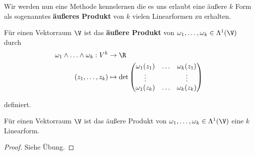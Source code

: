 \par
Wir werden nun eine Methode kennelernen die es uns erlaubt eine äußere \(k\) Form als sogenanntes \textbf{äußeres Produkt} von \(k\) vielen Linearformen zu erhalten.
\label{vektoranalysis/multilinear:definition-16}
\begin{definition}{}{}



\par
Für einen Vektorraum \(\V\) ist das \textbf{äußere Produkt} von \(\omega_1,\ldots,\omega_k\in\Lambda^1(\V)\)
durch
\begin{align*}
\omega_1\wedge\ldots\wedge\omega_k:V^k&\to\R\\
(z_1,\ldots,z_k)&\mapsto 
\det
\begin{pmatrix}
\omega_1(z_1)&\ldots&\omega_k(z_1)\\ 
\vdots&&\vdots\\
\omega_1(z_k)&\ldots&\omega_k(z_k)
\end{pmatrix}
\end{align*}
\par
definiert.
\end{definition}
\label{vektoranalysis/multilinear:lemma-17}
\begin{lemma}{}{}



\par
Für einen Vektorraum \(\V\) ist das äußere Produkt von \(\omega_1,\ldots,\omega_k\in\Lambda^1(\V)\) eine \(k\) Linearform.
\end{lemma}

\begin{proof}
 Siehe Übung.
\end{proof}

